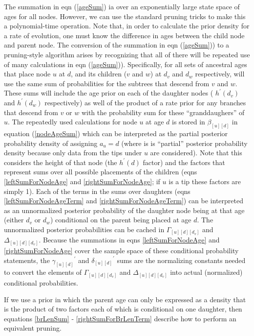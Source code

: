\documentclass{llncs}
\newcommand{\subtreeAgeSum}[2]{\ensuremath{\beta_{[{#1}][{#2}]}}\xspace}
\newcommand{\leftThreeDTable}[3]{\ensuremath{\Gamma_{[{#1}][{#2}][{#3}]}}\xspace}
\newcommand{\rightThreeDTable}[3]{\ensuremath{\Delta_{[{#1}][{#2}][{#3}]}}\xspace}
\newcommand{\leftSubtreeAgeSum}[2]{\ensuremath{\gamma_{[{#1}][{#2}]}}\xspace}
\newcommand{\rightSubtreeAgeSum}[2]{\ensuremath{\delta_{[{#1}][{#2}]}}\xspace}
\newcommand{\agePriorDensity}[0]{\ensuremath{h^{\prime}}\xspace}
\begin{document}
The summation in eqn (\ref{ageSum}) ia over an exponentially large state space of ages for all nodes.
However, we can use the standard pruning tricks to make this a polynomial-time operation.
Note that, in order to calculate the prior density for a rate of evolution, one must know
    the difference in ages between the child node and parent node.
The conversion of the summation in eqn (\ref{ageSum})) to a pruning-style algorithm arises by
    recognizing that all of there will be repeated use of many calculations in eqn (\ref{ageSum})).
Specifically, for all sets of ancestral ages that place node $u$ at $d$, and its children ($v$ and $w$) at
    $d_v$ and $d_w$ respectively, will use the same sum of probabilities for the subtrees
    that descend from $v$ and $w$.
These sums will include the age prior on each of the daughter nodes ( $h^{\prime}(d_v)$ and $h^{\prime}(d_w)$ respectively)
    as well of the product of a rate prior for any branches that descend from $v$ or $w$ with the
    probability sum for these ``granddaughers'' of $u$.
The repeatedly used calculations for node $u$ at age $d$ is stored in $\subtreeAgeSum{u}{d}$ in equation (\ref{nodeAgeSum})
    which can be interpreted as the partial posterior probability density of assigning $a_u=d$ 
    (where is is ``partial'' posterior probability density because only data from the tips under $u$
    are considered).
Note that this considers the height of that node (the $\agePriorDensity(d)$ factor) and the factors
    that represent sums over all possible placements of the children (eqns \ref{leftSumForNodeAge} and \ref{rightSumForNodeAge}; if $u$ is a tip these factors are simply 1).
Each of the terms in the sums over daughters (eqns \ref{leftSumForNodeAgeTerm} and \ref{rightSumForNodeAgeTerm})
    can be interpreted as an unnormalized posterior probability of the daughter node
    being at that age (either $d_v$ or $d_w$) conditional on the parent being placed
    at age $d$.
The unnormalized posterior probabilities can be cached in $\leftThreeDTable{u}{d}{d_v}$ and $\rightThreeDTable{u}{d}{d_v}$.
Because the summations in eqns \ref{leftSumForNodeAge} and \ref{rightSumForNodeAge} cover the sample space of
    these conditional probability statements, the $\leftSubtreeAgeSum{u}{d}^{\prime}$ and $\rightSubtreeAgeSum{u}{d}^{\prime}$ sums are the normalizing constants needed to convert the elements of
    $\leftThreeDTable{u}{d}{d_v}$ and $\rightThreeDTable{u}{d}{d_v}$ into actual (normalized) conditional probabilities.

If we use a prior in which the parent age can only be expressed as a density that is the product of
    two factors each of which is conditional on one daughter, then equations \ref{brLenSum} - \ref{rightSumForBrLenTerm}
    describe how to perform an equivalent pruning.
\end{document}
